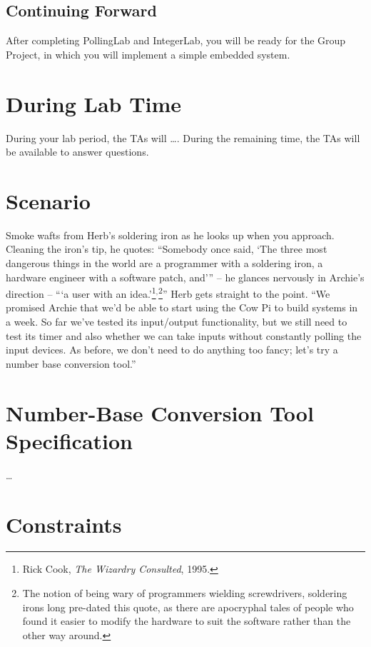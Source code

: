 \subsection*{Continuing Forward}

After completing PollingLab and IntegerLab, you will be ready for the Group
Project, in which you will implement a simple embedded system.

\section*{During Lab Time}

During your lab period, the TAs will \dots. During the remaining time, the TAs
will be available to answer questions.

\softwareengineeringfrontmatter

\section{Scenario}

Smoke wafts from Herb's soldering iron as he looks up when you approach.
Cleaning the iron's tip, he quotes: ``Somebody once said, `The three most
dangerous things in the world are a programmer with a soldering iron, a
hardware engineer with a software patch, and'{}'' -- he glances nervously in
Archie's direction -- ``{}`a user with an idea.'\footnote{Rick Cook, \textit{The
Wizardry Consulted}, 1995.}$^{\mathrm{,}}$\footnote{The notion of being wary of
programmers wielding screwdrivers, soldering irons long pre-dated this quote,
as there are apocryphal tales of people who found it easier to modify the
hardware to suit the software rather than the other way around.}'' Herb gets
straight to the point. ``We promised Archie that we'd be able to start using
the Cow Pi to build systems in a week. So far we've tested its input/output
functionality, but we still need to test its timer and also whether we can take
inputs without constantly polling the input devices. As before, we don't need
to do anything too fancy; let's try a number base conversion tool.''

\section{Number-Base Conversion Tool Specification} \label{sec:FunctionalSpecification}

\dots

\section{Constraints}\label{sec:Constraints}

